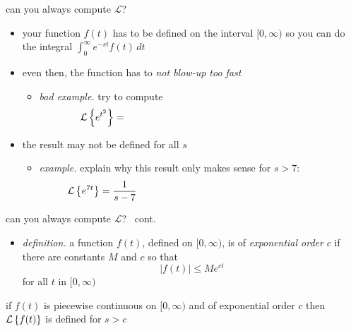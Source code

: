 \documentclass[urlcolor=blue,dvipsnames]{beamer}
\begin{document}
\begin{frame}{can you always compute $\mathcal{L}$?}

\begin{itemize}
\item your function $f(t)$ has to be defined on the interval $[0,\infty)$ so you can do the integral $\int_0^\infty e^{-st} f(t)\,dt$
\item even then, the function has to \emph{not blow-up too fast}
    \begin{itemize}
    \item \emph{bad example.}  try to compute
      $$\LL{e^{t^2}} = \hspace{70mm}$$
    \end{itemize}
\item the result may not be defined for all $s$
    \begin{itemize}
    \item \emph{example.}  explain why this result only makes sense for $s>7$:
      $$\LL{e^{7t}} = \frac{1}{s-7}\hspace{70mm}$$
    \end{itemize}

\end{itemize}
\end{frame}


\begin{frame}{can you always compute $\mathcal{L}$? \, cont.}

\begin{itemize}
\item \emph{definition.}  a function $f(t)$, defined on $[0,\infty)$, is of \emph{exponential order} $c$ if there are constants $M$ and $c$ so that
    $$|f(t)| \le M e^{ct}$$
for all $t$ in $[0,\infty)$
\end{itemize}

\bigskip
\begin{theorem}
if $f(t)$ is piecewise continuous on $[0,\infty)$ and of exponential order $c$ then $\mathcal{L}\left\{f(t)\right\}$ is defined for $s>c$
\end{theorem}
\end{frame}
\end{document}
